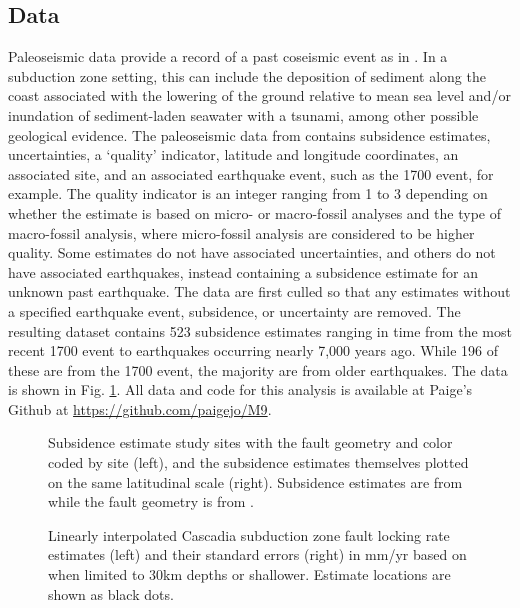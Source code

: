 {\subsection{Data}
\label{data}
Paleoseismic data provide a record of a past coseismic event as in \citet{leonard2010}.  In a subduction zone setting, this can include the deposition of sediment along the coast associated with the lowering of the ground relative to mean sea level and/or inundation of sediment-laden seawater with a tsunami, among other possible geological evidence.  The paleoseismic data from \citet{leonard2010} contains subsidence estimates, uncertainties, a `quality' indicator, latitude and longitude coordinates, an associated site, and an associated earthquake event, such as the 1700 event, for example.  The quality indicator is an integer ranging from 1 to 3 depending on whether the estimate is based on micro- or macro-fossil analyses and the type of macro-fossil analysis, where micro-fossil analysis are considered to be higher quality.  Some estimates do not have associated uncertainties, and others do not have associated earthquakes, instead containing a subsidence estimate for an unknown past earthquake.  The data are first culled so that any estimates without a specified earthquake event, subsidence, or uncertainty are removed.  The resulting dataset contains 523 subsidence estimates ranging in time from the most recent 1700 event to earthquakes occurring nearly 7,000 years ago.  While 196 of these are from the 1700 event, the majority are from older earthquakes.  The data is shown in Fig. \ref{subsidence}.  All data and code for this analysis is available at Paige's Github at \url{https://github.com/paigejo/M9}.

\begin{figure}
\centering
{}
\caption{Subsidence estimate study sites with the fault geometry and color coded by site (left), and the subsidence estimates themselves plotted on the same latitudinal scale (right).  Subsidence estimates are from \citet{leonard2010} while the fault geometry is from \citet{faultGeom}.}
\label{subsidence}
\end{figure}

\begin{figure}
\centering
{}
\caption{Linearly interpolated Cascadia subduction zone fault locking rate estimates (left) and their standard errors (right) in mm/yr based on \citet{evans2015} when limited to 30km depths or shallower. Estimate locations are shown as black dots.}
\label{locking}
\end{figure}

}
